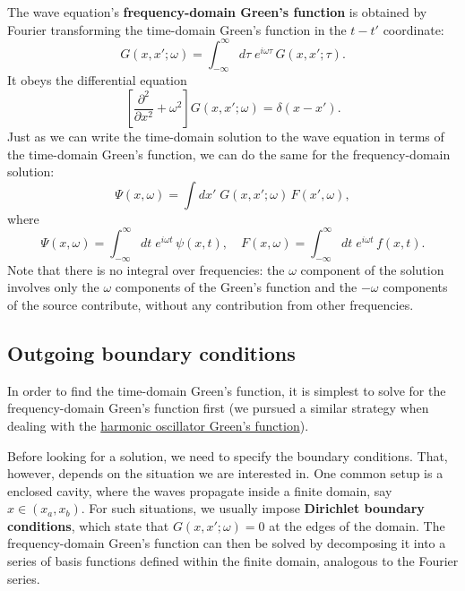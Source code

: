 \documentclass[10pt,a4paper]{article}
\begin{document}
The wave equation's \textbf{frequency-domain Green's function} is
obtained by Fourier transforming the time-domain Green's function in
the $t-t'$ coordinate:
\begin{equation}
  G(x,x';\omega) = \int_{-\infty}^\infty d\tau\; e^{i\omega \tau}\, G(x,x'; \tau).
\end{equation}
It obeys the differential equation
\begin{equation}
  \left[\frac{\partial^2}{\partial x^2} + \omega^2 \right]
  G(x,x';\omega) = \delta(x-x').
\end{equation}
Just as we can write the time-domain solution to the wave equation in
terms of the time-domain Green's function, we can do the same for the
frequency-domain solution:
\begin{equation}
  \Psi(x,\omega) = \int dx' \; G(x,x';\omega) \, F(x', \omega),
\end{equation}
where
\begin{equation}
  \Psi(x,\omega) = \int_{-\infty}^\infty dt \; e^{i\omega t} \, \psi(x,t),
  \quad F(x,\omega) = \int_{-\infty}^\infty dt \; e^{i\omega t} \, f(x,t).
\end{equation}
Note that there is no integral over frequencies: the $\omega$
component of the solution involves only the $\omega$ components of the
Green's function and the $-\omega$ components of the source
contribute, without any contribution from other frequencies.

\subsection{Outgoing boundary conditions}
\label{outgoing}

In order to find the time-domain Green's function, it is simplest to
solve for the frequency-domain Green's function first (we pursued a
similar strategy when dealing with the
\hyperref[driven-oscillator]{harmonic oscillator Green's function}).

Before looking for a solution, we need to specify the boundary
conditions. That, however, depends on the situation we are interested
in. One common setup is a enclosed cavity, where the waves propagate
inside a finite domain, say $x \in (x_a,x_b)$. For such situations, we
usually impose \textbf{Dirichlet boundary conditions}, which state
that $G(x,x';\omega) = 0$ at the edges of the domain. The
frequency-domain Green's function can then be solved by decomposing it
into a series of basis functions defined within the finite domain,
analogous to the Fourier series.
\end{document}
